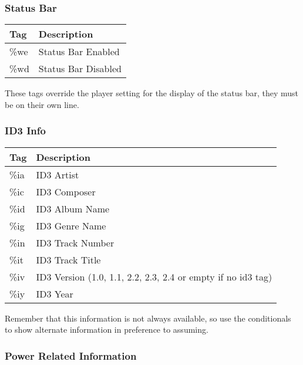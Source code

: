 \subsubsection{Status Bar}
\begin{tabular}{@{}ll@{}}\toprule
\textbf{Tag} & \textbf{Description}\\\midrule
\%we & Status Bar Enabled\\
\%wd & Status Bar Disabled\\\bottomrule
\end{tabular}
\newline
\newline
These tags override the player setting for the display of the status bar, they must be on their own line.

\subsubsection{ID3 Info}

  \begin{tabular}{@{}ll@{}}\toprule
    \textbf{Tag} & \textbf{Description}\\\midrule
    \%ia & ID3 Artist\\
    \%ic & ID3 Composer\\
    \%id & ID3 Album Name\\
    \%ig & ID3 Genre Name\\
    \%in & ID3 Track Number\\
    \%it & ID3 Track Title\\
    \%iv & ID3 Version (1.0, 1.1, 2.2, 2.3, 2.4 or empty if no id3 tag)\\
    \%iy & ID3 Year\\\bottomrule
  \end{tabular}
\newline
\newline
Remember that this information is not always available, so use the conditionals to show alternate information in preference to assuming.

\subsubsection{Power Related Information}

